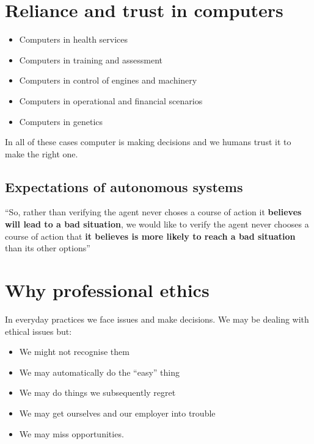 \documentclass{article}
\begin{document}
\tableofcontents

\newpage

\section{Reliance and trust in computers}
\begin{itemize}
  \item Computers in health services
  \item Computers in training and assessment
  \item Computers in control of engines and machinery
  \item Computers in operational and financial scenarios
  \item Computers in genetics
\end{itemize}
In all of these cases computer is making decisions and we humans trust it to make the right one.

\subsection{Expectations of autonomous systems}

``So, rather than verifying the agent never choses a course of action it \textbf{believes will lead to a bad situation}, we would like to verify the agent never chooses a course of action that \textbf{it believes is more likely to reach a bad situation} than its other options''

\section{Why professional ethics}

\begin{flushleft}
In everyday practices we face issues and make decisions. We may be dealing with ethical issues but:
\end{flushleft}
\begin{itemize}
  \item We might not recognise them
  \item We may automatically do the “easy” thing
  \item We may do things we subsequently regret
  \item We may get ourselves and our employer into trouble
  \item We may miss opportunities.
\end{itemize}
\end{document}
